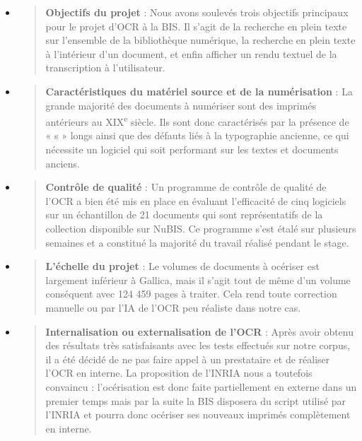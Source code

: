 \documentclass[a4paper,12pt,twoside]{book}
\begin{document}
\begin{itemize}
	\item
	\begin{quote}
		\textbf{Objectifs du projet} : Nous avons soulevés trois objectifs principaux pour le projet d'OCR à la BIS. Il s'agit de la recherche en plein texte sur l'ensemble de la bibliothèque numérique, la recherche en plein texte à l'intérieur d'un document, et enfin afficher un rendu textuel de la transcription à l'utilisateur.
	\end{quote}
	\item
	\begin{quote}
		\textbf{Caractéristiques du matériel source et de la numérisation} :
		La grande majorité des documents à numériser sont des imprimés antérieurs au XIX\textsuperscript{e} siècle. Ils sont donc caractérisés par la présence de « s » longs ainsi que des défauts liés à la typographie ancienne, ce qui nécessite un logiciel qui soit performant sur les textes et documents anciens.
	\end{quote}
	\item
	\begin{quote}
		\textbf{Contrôle de qualité} : Un programme de contrôle de qualité de
		l'OCR a bien été mis en place en évaluant l'efficacité de cinq logiciels sur un échantillon de 21 documents qui sont représentatifs de la collection disponible sur NuBIS. Ce programme s'est étalé sur plusieurs semaines et a constitué la majorité du travail réalisé pendant le stage. 
	\end{quote}
	\item
	\begin{quote}
		\textbf{L'échelle du projet} : Le volumes de documents à océriser est largement inférieur à Gallica, mais il s'agit tout de même d'un volume conséquent avec 124 459 pages à traiter. Cela rend toute correction manuelle ou par l'IA de l'OCR peu réaliste dans notre cas. 
	\end{quote}
	\item
	\begin{quote}
		\textbf{Internalisation ou externalisation de l'OCR} :
		Après avoir obtenu des résultats très satisfaisants avec les tests effectués sur notre corpus, il a été décidé de ne pas faire appel à un prestataire et de réaliser l'OCR en interne. La proposition de l'INRIA nous a toutefois convaincu : l'océrisation est donc faite partiellement en externe dans un premier temps mais par la suite la BIS disposera du script utilisé par l'INRIA et pourra donc océriser ses nouveaux imprimés complètement en interne.

\end{quote}
\end{itemize}
\end{document}
